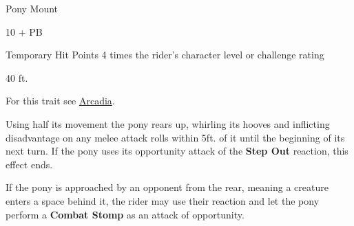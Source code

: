 \documentclass[letterpaper,twocolumn,openany,nodeprecatedcode]{dndbook}
\begin{document}
\begin{DndMonster}[float*=b,width=\textwidth + 8pt]{Pony Mount}
  \begin{multicols}{2}

    \DndMonsterLine
    \begin {CustomBasics}
      \item[\armorclassname] 10 + PB
      \item[Temporary Hit Points] 4 times the rider's character level or challenge rating
      \item[\hitpointsname]  
      \item[\speedname] 40 ft.
    \end {CustomBasics}
    \DndMonsterLine

    \DndMonsterAbilityScores[
        str = 15,
        dex = 10,
        con = 13,
        int = 2,
        wis = 11,
        cha = 7,
      ]

    \DndMonsterDetails[
        senses = {passive Perception 10},
        languages = {-},
        challenge = 1/8,
      ]

    For this trait see \href{https://www.youtube.com/watch?v=oid4QMMXjfs}{Arcadia}.


    \DndMonsterAttack[
      name=Combat Stomp,
      distance=melee, %
      mod={+2 + PB},
      dmg=\DndDice{2d4 + 2},
      dmg-type=bludgeoning,
      extra={. If the target is a Medium or smaller creature, it must succeed on a DC 10 + PB Strength saving throw or be knocked prone.}
    ]

    Using half its movement the pony rears up, whirling its hooves and inflicting disadvantage on any melee attack rolls within 5ft. of it until the beginning of its next turn. If the pony uses its opportunity attack of the \textbf{Step Out} reaction, this effect ends.


    If the pony is approached by an opponent from the rear, meaning a creature enters a space behind it, the rider may use their reaction and let the pony perform a \textbf{Combat Stomp} as an attack of opportunity.

  \end{multicols}
\end{DndMonster}
\end{document}
